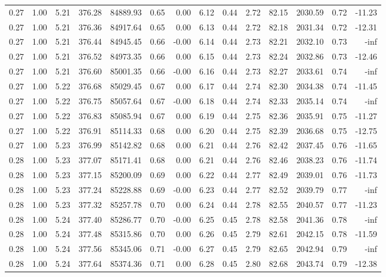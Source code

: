 \begin{table}[!ht]
\begin{tabular}{rrrrrrrrrrrrrr}
0.27 & 1.00 & 5.21 & 376.28 & 84889.93 & 0.65 & 0.00 & 6.12 & 0.44 & 2.72 & 82.15 & 2030.59 & 0.72 & -11.23 \\
0.27 & 1.00 & 5.21 & 376.36 & 84917.64 & 0.65 & 0.00 & 6.13 & 0.44 & 2.72 & 82.18 & 2031.34 & 0.72 & -12.31 \\
0.27 & 1.00 & 5.21 & 376.44 & 84945.45 & 0.66 & -0.00 & 6.14 & 0.44 & 2.73 & 82.21 & 2032.10 & 0.73 & -inf \\
0.27 & 1.00 & 5.21 & 376.52 & 84973.35 & 0.66 & 0.00 & 6.15 & 0.44 & 2.73 & 82.24 & 2032.86 & 0.73 & -12.46 \\
0.27 & 1.00 & 5.21 & 376.60 & 85001.35 & 0.66 & -0.00 & 6.16 & 0.44 & 2.73 & 82.27 & 2033.61 & 0.74 & -inf \\
0.27 & 1.00 & 5.22 & 376.68 & 85029.45 & 0.67 & 0.00 & 6.17 & 0.44 & 2.74 & 82.30 & 2034.38 & 0.74 & -11.45 \\
0.27 & 1.00 & 5.22 & 376.75 & 85057.64 & 0.67 & -0.00 & 6.18 & 0.44 & 2.74 & 82.33 & 2035.14 & 0.74 & -inf \\
0.27 & 1.00 & 5.22 & 376.83 & 85085.94 & 0.67 & 0.00 & 6.19 & 0.44 & 2.75 & 82.36 & 2035.91 & 0.75 & -11.27 \\
0.27 & 1.00 & 5.22 & 376.91 & 85114.33 & 0.68 & 0.00 & 6.20 & 0.44 & 2.75 & 82.39 & 2036.68 & 0.75 & -12.75 \\
0.27 & 1.00 & 5.23 & 376.99 & 85142.82 & 0.68 & 0.00 & 6.21 & 0.44 & 2.76 & 82.42 & 2037.45 & 0.76 & -11.65 \\
0.28 & 1.00 & 5.23 & 377.07 & 85171.41 & 0.68 & 0.00 & 6.21 & 0.44 & 2.76 & 82.46 & 2038.23 & 0.76 & -11.74 \\
0.28 & 1.00 & 5.23 & 377.15 & 85200.09 & 0.69 & 0.00 & 6.22 & 0.44 & 2.77 & 82.49 & 2039.01 & 0.76 & -11.73 \\
0.28 & 1.00 & 5.23 & 377.24 & 85228.88 & 0.69 & -0.00 & 6.23 & 0.44 & 2.77 & 82.52 & 2039.79 & 0.77 & -inf \\
0.28 & 1.00 & 5.23 & 377.32 & 85257.78 & 0.70 & 0.00 & 6.24 & 0.44 & 2.78 & 82.55 & 2040.57 & 0.77 & -11.23 \\
0.28 & 1.00 & 5.24 & 377.40 & 85286.77 & 0.70 & -0.00 & 6.25 & 0.45 & 2.78 & 82.58 & 2041.36 & 0.78 & -inf \\
0.28 & 1.00 & 5.24 & 377.48 & 85315.86 & 0.70 & 0.00 & 6.26 & 0.45 & 2.79 & 82.61 & 2042.15 & 0.78 & -11.59 \\
0.28 & 1.00 & 5.24 & 377.56 & 85345.06 & 0.71 & -0.00 & 6.27 & 0.45 & 2.79 & 82.65 & 2042.94 & 0.79 & -inf \\
0.28 & 1.00 & 5.24 & 377.64 & 85374.36 & 0.71 & 0.00 & 6.28 & 0.45 & 2.80 & 82.68 & 2043.74 & 0.79 & -12.38 \\

\end{tabular}
\end{table}
